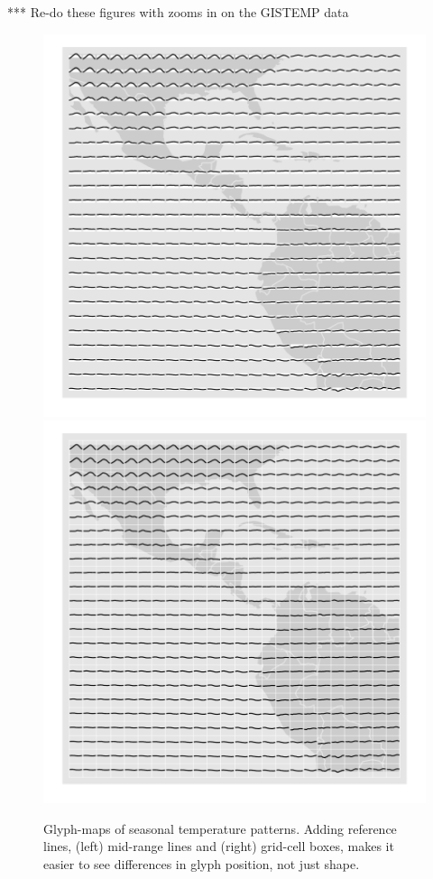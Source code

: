 \documentclass[oneside]{article}
\begin{document}


*** Re-do these figures with zooms in on the GISTEMP data

\begin{figure}[htbp]
  \centering
  \includegraphics[width=0.5\linewidth]{ref-line}%
  \includegraphics[width=0.5\linewidth]{ref-box}

  \caption{Glyph-maps of seasonal temperature patterns. Adding reference lines, (left) mid-range lines and (right) grid-cell boxes, makes it easier to see differences in glyph position, not just shape.}
  \label{fig:ref-basic}
\end{figure}
\end{document}
